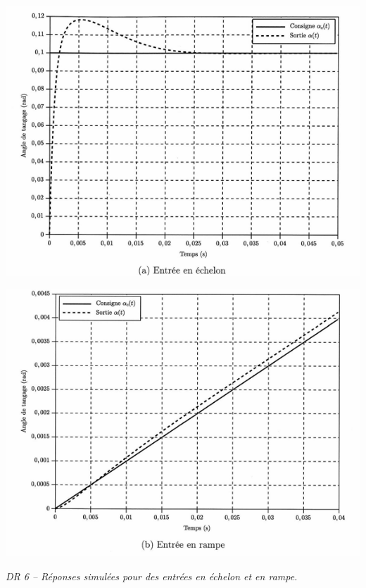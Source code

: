 \documentclass[10pt,fleqn]{article} %
\begin{document}
\begin{center}
\includegraphics[width=.9\linewidth]{images/DR_06}

\includegraphics[width=.9\linewidth]{images/DR_06_b}

\textit{DR 6 -- Réponses simulées pour des entrées en échelon et en rampe.}
\end{center}
\end{document}
